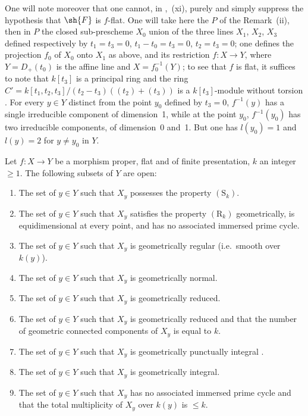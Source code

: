 \begin{remarks}[12.2.3]
\begin{enumerate}[label=(\roman*)]
One will note moreover that one cannot, in ,~(xi), purely and simply suppress the hypothesis that $\sh{F}$ is $f$-flat.
One will take here the $P$ of the Remark~(ii), then in $P$ the closed sub-prescheme $X_0$ union of the three lines $X_1$, $X_2$, $X_3$ defined respectively by $t_1=t_3=0$, $t_1-t_0=t_3=0$, $t_2=t_3=0$; one defines the projection $f_0$ of $X_0$ onto $X_1$ as above, and its restriction $f:X\to Y$, where $Y=D_+(t_0)$ is the affine line and $X=f_0^{-1}(Y)$; to see that $f$ is flat, it suffices to note that $k[t_3]$ is a principal ring and the ring $C'=k[t_1,t_2,t_3]/(t_2-t_3)((t_2)+(t_3))$ is a $k[t_3]$-module without torsion .
For every $y\in Y$ distinct from the point $y_0$ defined by $t_3=0$, $f^{-1}(y)$ has a single irreducible component of dimension~1, while at the point $y_0$, $f^{-1}(y_0)$ has two irreducible components, of dimension~0 and~1.
But one has $l(y_0)=1$ and $l(y)=2$ for $y\neq y_0$ in $Y$.
\end{enumerate}
\end{remarks}

\begin{theorem}[12.2.4]
\label{IV.12.2.4}
Let $f:X\to Y$ be a morphism proper, flat and of finite presentation, $k$ an integer $\geqslant 1$.
The following subsets of $Y$ are open:
\begin{enumerate}[label=(\roman*)]
  \item The set of $y\in Y$ such that $X_y$ possesses the property $(\mathrm{S}_k)$.
  \item The set of $y\in Y$ such that $X_y$ satisfies the property $(\mathrm{R}_k)$ geometrically, is equidimensional at every point, and has no associated immersed prime cycle.
  \item The set of $y\in Y$ such that $X_y$ is geometrically regular (i.e.\ smooth over $k(y)$).
  \item The set of $y\in Y$ such that $X_y$ is geometrically normal.
  \item The set of $y\in Y$ such that $X_y$ is geometrically reduced.
  \item The set of $y\in Y$ such that $X_y$ is geometrically reduced and that the number of geometric connected components of $X_y$ is equal to $k$.
  \item The set of $y\in Y$ such that $X_y$ is geometrically punctually integral .
  \item The set of $y\in Y$ such that $X_y$ is geometrically integral.
  \item The set of $y\in Y$ such that $X_y$ has no associated immersed prime cycle and that the total multiplicity  of $X_y$ over $k(y)$ is $\leqslant k$.
\end{enumerate}
\end{theorem}

